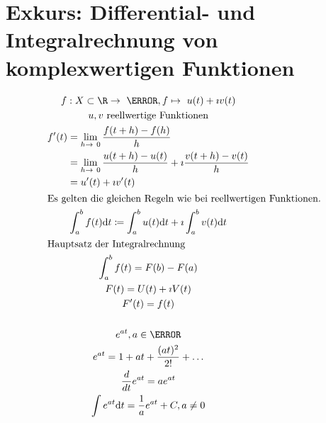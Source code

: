 \section{Exkurs: Differential- und Integralrechnung von komplexwertigen Funktionen}
\begin{gather*}
	f: X \subset \R \rightarrow \C , f \mapsto u(t) + \imath v(t) \\
	u , v \text{ reellwertige Funktionen} \\
	\begin{split}
		f'(t)
			&= \lim_{h \rightarrow 0} \frac{f(t+h) - f(h)}{h} \\
			&= \lim_{h \rightarrow 0} \frac{u(t+h) - u(t)}{h} + \imath \frac{v(t+h) - v(t)}{h} \\
			&= u'(t) + \imath v'(t)
	\end{split} \\
	\intertext{Es gelten die gleichen Regeln wie bei reellwertigen Funktionen.}
	\int_a^b f(t) \dd t \coloneqq \int_a^b u(t) \dd t + \imath \int_a^b v(t) \dd t\\
	\intertext{Hauptsatz der Integralrechnung}
	\int_a^b f(t) = F(b) - F(a) \\
	F(t) = U(t) + \imath V(t) \\
	F'(t) = f(t) \\
	\\
	e^{at} , a \in \C \\
	e^{at} = 1 + at + \frac{(at)^2}{2!} + \dots \\
	\frac{d}{dt} e^{at} = a e^{at} \\
	\int e^{at} \dd t = \frac{1}{a} e^{at} + C , a \neq 0
\end{gather*}

